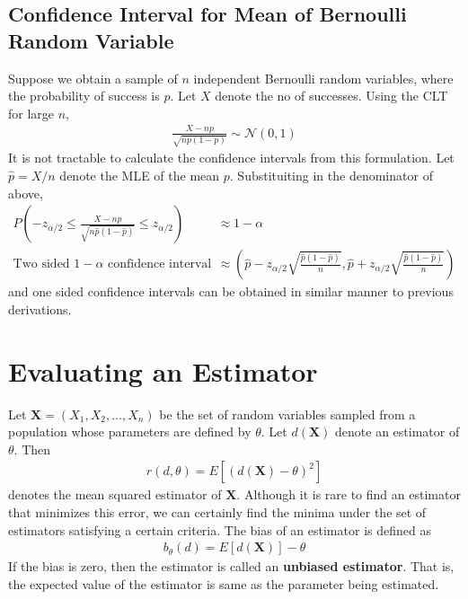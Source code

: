 \documentclass[../probability-notes.tex]{subfiles}
\begin{document}
    \subsection{Confidence Interval for Mean of Bernoulli Random Variable}
    Suppose we obtain a sample of $n$ independent Bernoulli random variables, where the probability of success is $p$. Let $X$ denote the no of successes. Using the CLT for large $n$,
    \begin{align*}
        \frac{X - np}{\sqrt{np(1-p)}} \sim \mathcal{N}(0, 1)
    \end{align*}
    It is not tractable to calculate the confidence intervals from this formulation. Let $\hat{p} = X/n$ denote the MLE of the mean $p$. Substituiting in the denominator of above,
    \begin{align*}
        P(-z_{\alpha/2} \leq \frac{X - np}{\sqrt{n\hat{p}(1-\hat{p})}} \leq z_{\alpha/2}) &\approx 1-\alpha\\
        \text{Two sided $1-\alpha$ confidence interval} &\approx (\hat{p} - z_{\alpha/2}\sqrt{\frac{\hat{p}(1-\hat{p})}{n}}, \hat{p} + z_{\alpha/2}\sqrt{\frac{\hat{p}(1-\hat{p})}{n}})
    \end{align*}
    and one sided confidence intervals can be obtained in similar manner to previous derivations.

    

    \section{Evaluating an Estimator}
    Let $\boldsymbol{X} = (X_{1}, X_{2}, \ldots, X_{n})$ be the set of random variables sampled from a population whose parameters are defined by $\theta$. Let $d(\boldsymbol{X})$ denote an estimator of $\theta$. Then
    \begin{align*}
        r(d, \theta) = E[(d(\boldsymbol{X}) - \theta)^{2}]
    \end{align*}
    denotes the mean squared estimator of $\boldsymbol{X}$. Although it is rare to find an estimator that minimizes this error, we can certainly find the minima under the set of estimators satisfying a certain criteria.\newline
    The bias of an estimator is defined as
    \begin{align*}
        b_{\theta}(d) = E[d(\boldsymbol{X})] - \theta
    \end{align*}
    If the bias is zero, then the estimator is called an \textbf{unbiased estimator}. That is, the expected value of the estimator is same as the parameter being estimated.\newline
\end{document}
